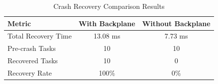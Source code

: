 \begin{table}[t]
\centering
\caption{Crash Recovery Comparison Results}
\label{tab:crash_recovery}
\begin{tabular}{lcc}
\toprule
\textbf{Metric} & \textbf{With Backplane} & \textbf{Without Backplane} \\
\midrule
Total Recovery Time & 13.08 ms & 7.73 ms \\
Pre-crash Tasks & 10 & 10 \\
Recovered Tasks & 10 & 0 \\
Recovery Rate & 100\% & 0\% \\
\bottomrule
\end{tabular}
\end{table}
